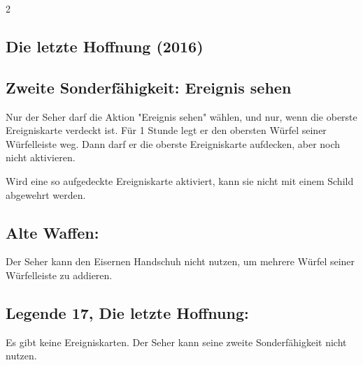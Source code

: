 \documentclass[10pt, a4paper, oneside]{book}
\begin{document}
\begin{multicols*}{2}
\begin{bgcolor}
\end{bgcolor}



\columnbreak


\begin{bgcolor}
\section{Die letzte Hoffnung (2016)}



\subsection{Zweite Sonderfähigkeit: Ereignis sehen}

Nur der Seher darf die Aktion "Ereignis sehen" wählen, und nur, wenn die oberste Ereigniskarte verdeckt ist. Für 1 Stunde legt er den obersten Würfel seiner Würfelleiste weg. Dann darf er die oberste Ereigniskarte aufdecken, aber noch nicht aktivieren.

Wird eine so aufgedeckte Ereigniskarte aktiviert, kann sie nicht mit einem Schild abgewehrt werden.
\supercite{dh11-heldenkarte-seher}



\subsection{Alte Waffen:}

Der Seher kann den Eisernen Handschuh nicht nutzen, um mehrere Würfel seiner Würfelleiste zu addieren.
\supercite{dh-faq,dh-begleitheft}






\subsection{Legende 17, Die letzte Hoffnung:}

Es gibt keine Ereigniskarten. Der Seher kann seine zweite Sonderfähigkeit nicht nutzen.
\supercite{dh-begleitheft}

\end{bgcolor}













\begin{bgcolor}[color-ag]

\end{bgcolor}
\end{multicols*}
\end{document}
